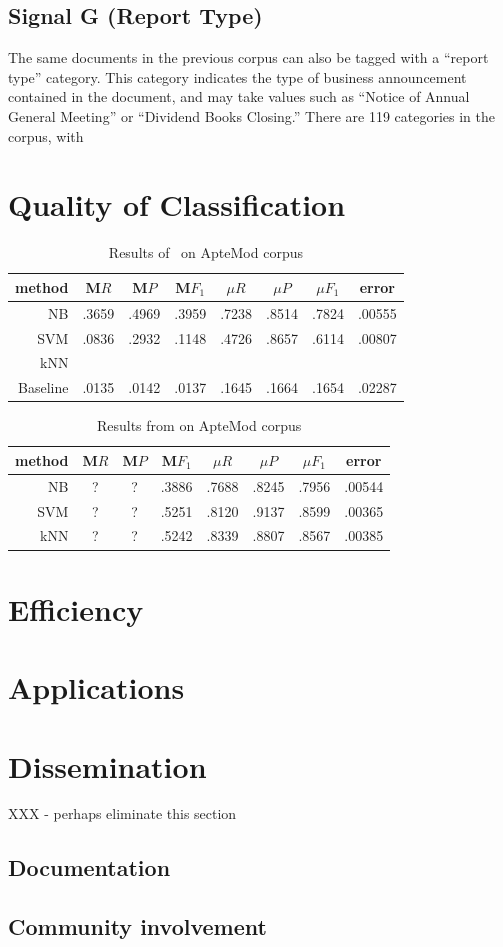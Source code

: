 \subsection{Signal G (Report Type)}

The same documents in the previous corpus can also be tagged with a
``report type'' category.  This category indicates the type of
business announcement contained in the document, and may take values
such as ``Notice of Annual General Meeting'' or ``Dividend Books
Closing.''  There are 119 categories in the corpus, with 



\section{Quality of Classification}
\label{Quality}

\begin{table}
\begin{tabular}{|r c c c c c c c|}
\hline
method & M$R$ & M$P$ & M$F_1$ & $\mu R$ & $\mu P$ & $\mu F_1$ & error \\
\hline
NB       & .3659 & .4969 & .3959 & .7238 & .8514 & .7824 & .00555 \\
SVM      & .0836 & .2932 & .1148 & .4726 & .8657 & .6114 & .00807 \\
kNN      & \\
Baseline & .0135 & .0142 & .0137 & .1645 & .1664 & .1654 & .02287 \\
\hline
\end{tabular}
\caption{Results of \aicat\ on ApteMod corpus}
\end{table}

\begin{table}
\begin{tabular}{|r c c c c c c c|}
\hline
method & M$R$ & M$P$ & M$F_1$ & $\mu R$ & $\mu P$ & $\mu F_1$ & error \\
\hline
NB  & ? & ? & .3886 & .7688 & .8245 & .7956 & .00544 \\
SVM & ? & ? & .5251 & .8120 & .9137 & .8599 & .00365 \\
kNN & ? & ? & .5242 & .8339 & .8807 & .8567 & .00385 \\
\hline
\end{tabular}
\caption{Results from \cite{yang:99} on ApteMod corpus}
\end{table}


\section{Efficiency}
\label{Efficiency}

\section{Applications}
\label{Applications}

\section{Dissemination}
XXX - perhaps eliminate this section

\subsection{Documentation}
\subsection{Community involvement}
